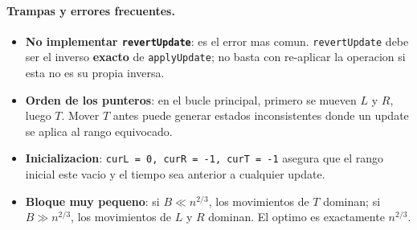 \paragraph{Trampas y errores frecuentes.}
\begin{itemize}\setlength\itemsep{0pt}
	\item \textbf{No implementar \texttt{revertUpdate}}: es el error mas comun. \verb|revertUpdate| debe ser el inverso \textbf{exacto} de \verb|applyUpdate|; no basta con re-aplicar la operacion si esta no es su propia inversa.
	\item \textbf{Orden de los punteros}: en el bucle principal, primero se mueven $L$ y $R$, luego $T$. Mover $T$ antes puede generar estados inconsistentes donde un update se aplica al rango equivocado.
	\item \textbf{Inicializacion}: \verb|curL = 0, curR = -1, curT = -1| asegura que el rango inicial este vacio y el tiempo sea anterior a cualquier update.
	\item \textbf{Bloque muy pequeno}: si $B \ll n^{2/3}$, los movimientos de $T$ dominan; si $B \gg n^{2/3}$, los movimientos de $L$ y $R$ dominan. El optimo es exactamente $n^{2/3}$.
\end{itemize}

